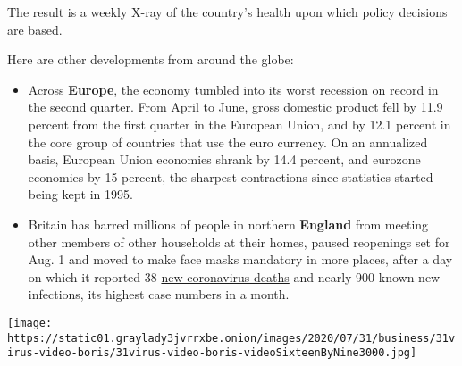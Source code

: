 The result is a weekly X-ray of the country's health upon which policy
decisions are based.

Here are other developments from around the globe:

\begin{itemize}
\item
  Across \textbf{Europe}, the economy tumbled into its worst recession
  on record in the second quarter. From April to June, gross domestic
  product fell by 11.9 percent from the first quarter in the European
  Union, and by 12.1 percent in the core group of countries that use the
  euro currency. On an annualized basis, European Union economies shrank
  by 14.4 percent, and eurozone economies by 15 percent, the sharpest
  contractions since statistics started being kept in 1995.
\item
  Britain has barred millions of people in northern \textbf{England}
  from meeting other members of other households at their homes, paused
  reopenings set for Aug. 1 and moved to make face masks mandatory in
  more places, after a day on which it reported 38
  \href{https://www.nytimes3xbfgragh.onion/interactive/2020/world/europe/united-kingdom-coronavirus-cases.html}{new
  coronavirus deaths} and nearly 900 known new infections, its highest
  case numbers in a month.
\end{itemize}

\texttt{[image: https://static01.graylady3jvrrxbe.onion/images/2020/07/31/business/31virus-video-boris/31virus-video-boris-videoSixteenByNine3000.jpg]}

